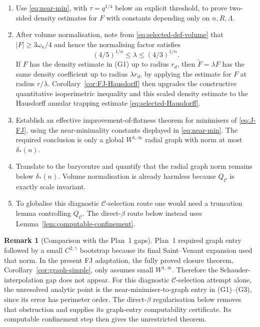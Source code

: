 \documentclass[11pt]{amsart}
\theoremstyle{definition}
\newtheorem{remark}[theorem]{Remark}
\begin{document}
\begin{enumerate}[label=\textnormal{(G\arabic*)},leftmargin=2.8em]
\item Use \eqref{eq:near-min}, with \(\tau=q^{1/4}\) below an explicit
threshold, to prove two-sided density estimates for \(F\) with constants
depending only on \(n,R,\Lambda\).
\item After volume normalisation, note from
\eqref{eq:selected-def-volume} that \(|F|\ge3\omega_n/4\) and hence the
normalising factor satisfies
\[
   (4/5)^{1/n}\le\lambda\le(4/3)^{1/n}.
\]
If \(F\) has the density estimate in (G1) up to radius \(r_d\), then
\(\widetilde F=\lambda F\) has the same density coefficient up to radius
\(\lambda r_d\), by applying the estimate for \(F\) at radius \(r/\lambda\).
Corollary~\ref{cor:FJ-Hausdorff} then upgrades the constructive quantitative
isoperimetric inequality and this scaled density estimate to the Hausdorff
annular trapping estimate \eqref{eq:selected-Hausdorff}.
\item Establish an effective improvement-of-flatness theorem for minimisers
of \eqref{eq:J-FJ}, using the near-minimality constants displayed in
\eqref{eq:near-min}.  The required conclusion is only a global
\(W^{1,\infty}\) radial graph with norm at most \(\delta_*(n)\).
\item Translate to the barycentre and quantify that the radial graph norm
remains below \(\delta_*(n)\).  Volume normalisation is already harmless
because \(Q_{\mathcal C}\) is exactly scale invariant.
\item To globalise this diagnostic \(\mathcal C\)-selection route one would
need a truncation lemma controlling \(Q_{\mathcal C}\).  The direct-\(\beta\)
route below instead uses Lemma~\ref{lem:computable-confinement}.
\end{enumerate}

\begin{remark}[Comparison with the Plan~1 gaps]\label{rem:Plan1-comparison}
Plan~1 required graph entry followed by a small \(C^{2,\gamma}\) bootstrap
because its final Saint--Venant expansion used that norm.  In the present
FJ adaptation, the fully proved closure theorem,
Corollary~\ref{cor:graph-simple}, only assumes small
\(W^{1,\infty}\).  Therefore the Schauder-interpolation gap does not appear.
For this diagnostic \(\mathcal C\)-selection attempt alone, the unresolved
analytic point is the near-minimiser-to-graph entry in (G1)--(G3), since its
error has perimeter order.  The direct-\(\beta\) regularisation below removes
that obstruction and supplies its graph-entry computability certificate.
Its computable confinement step then gives the unrestricted theorem.
\end{remark}
\end{document}
